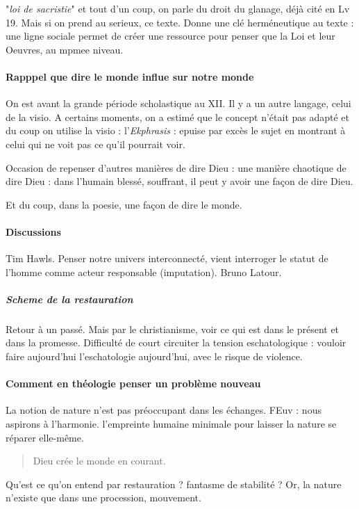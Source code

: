 "\textit{loi de sacristie}" et tout d'un coup, on parle du droit du glanage, déjà cité en Lv 19. 
Mais si on prend au serieux, ce texte. 
Donne une clé herméneutique au texte : une ligne sociale permet de créer une ressource pour penser que la Loi et leur Oeuvres, au mpmee niveau. 

                                                         
\paragraph{Rapppel que dire le monde influe sur notre monde}  On est avant la grande période scholastique au XII. Il y a un autre langage, celui de la visio. A certains moments, on a estimé que le concept n'était pas adapté et du coup on utilise la visio : l'\textit{Ekphrasis} : epuise par excès le sujet en montrant à celui qui ne voit pas ce qu'il pourrait voir.

Occasion de repenser d'autres manières de dire Dieu : une manière chaotique de dire Dieu : dans l'humain blessé, souffrant, il peut y avoir une façon de dire Dieu.

Et du coup, dans la poesie, une façon de dire le monde.

\paragraph{Discussions} Tim Hawls. Penser notre univers interconnecté, vient interroger le statut de l'homme comme acteur responsable (imputation). Bruno Latour.

\subparagraph{Scheme de la restauration} Retour à un passé. Mais par le christianisme, voir ce qui est dans le présent et dans la promesse. Difficulté de court circuiter la tension eschatologique : vouloir faire aujourd'hui l'eschatologie aujourd'hui, avec le risque de violence. 

\paragraph{Comment en théologie penser un problème nouveau} La notion de nature n'est pas préoccupant dans les échanges. FEuv : nous aspirons à l'harmonie. l'empreinte humaine minimale pour laisser la nature se réparer elle-même. 
\begin{quote}
    Dieu crée le monde en courant. 
\end{quote}
Qu'est ce qu'on entend par restauration ? fantasme de stabilité ? Or, la nature n'existe que dans une procession, mouvement.

